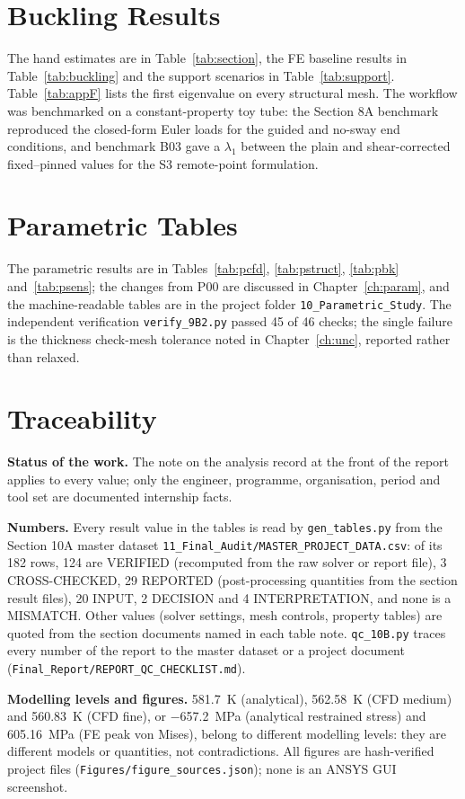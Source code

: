

\chapter{Buckling Results}\label{app:buckling}
The hand estimates are in Table~\ref{tab:section}, the FE baseline results in Table~\ref{tab:buckling} and the support scenarios in
Table~\ref{tab:support}. Table~\ref{tab:appF} lists the first eigenvalue on every structural mesh. The workflow was benchmarked on a
constant-property toy tube: the Section 8A benchmark reproduced the closed-form Euler loads for the guided and no-sway end conditions, and
benchmark B03 gave a $\lambda_1$ between the plain and shear-corrected fixed--pinned values for the S3 remote-point formulation.



\chapter{Parametric Tables}\label{app:param}
The parametric results are in Tables~\ref{tab:pcfd}, \ref{tab:pstruct}, \ref{tab:pbk} and~\ref{tab:psens}; the changes from P00 are discussed in
Chapter~\ref{ch:param}, and the machine-readable tables are in the project folder \texttt{10\_Parametric\_Study}. The independent verification
\texttt{verify\_9B2.py} passed 45 of 46 checks; the single failure is the thickness check-mesh tolerance noted in Chapter~\ref{ch:unc},
reported rather than relaxed.

\chapter{Traceability}\label{app:trace}
\textbf{Status of the work.} The note on the analysis record at the front of the report applies to every value; only the engineer,
programme, organisation, period and tool set are documented internship facts.

\textbf{Numbers.} Every result value in the tables is read by \texttt{gen\_tables.py} from the Section 10A master dataset
\texttt{11\_Final\_Audit/MASTER\_PROJECT\_DATA.csv}: of its 182 rows, 124 are VERIFIED (recomputed from the raw solver or report file),
3 CROSS-CHECKED, 29 REPORTED (post-processing quantities from the section result files), 20 INPUT, 2 DECISION and 4 INTERPRETATION, and none
is a MISMATCH. Other values (solver settings, mesh controls, property tables) are quoted from the section documents named in each table note.
\texttt{qc\_10B.py} traces every number of the report to the master dataset or a project document (\texttt{Final\_Report/REPORT\_QC\_CHECKLIST.md}).

\textbf{Modelling levels and figures.} 581.7~K (analytical), 562.58~K (CFD medium) and 560.83~K (CFD fine), or $-$657.2~MPa (analytical
restrained stress) and 605.16~MPa (FE peak von Mises), belong to different modelling levels: they are different models or quantities, not
contradictions. All figures are hash-verified project files (\texttt{Figures/figure\_sources.json}); none is an ANSYS GUI screenshot.

